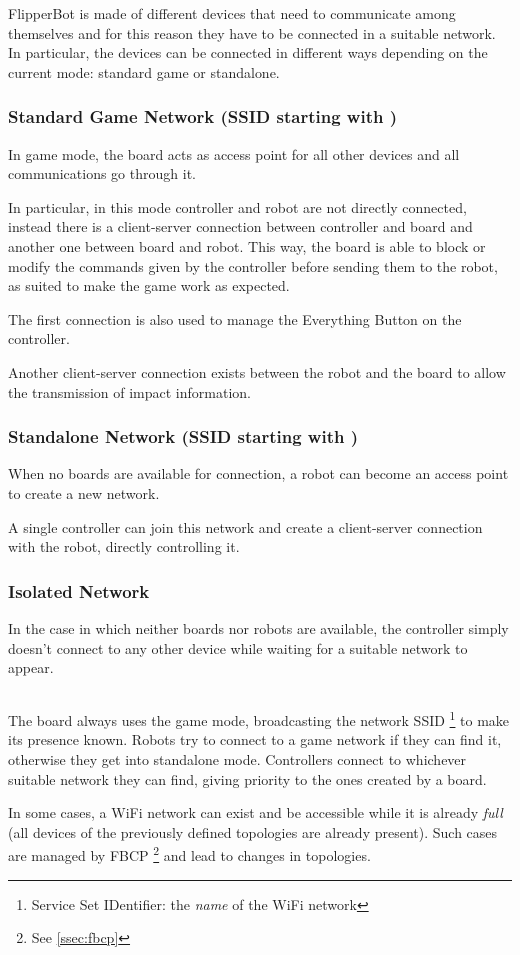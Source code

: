 FlipperBot is made of different devices that need to communicate
among themselves and for this reason they have to be connected in a
suitable network. In particular, the devices can be connected in
different ways depending on the current mode: standard game or
standalone.

\subsubsection{Standard Game Network (SSID starting with
  )}
  In game mode, the board acts as access point for all other devices
  and all communications go through it.

  In particular, in this mode controller and robot are not directly
  connected, instead there is a client-server connection between
  controller and board and another one between board and robot. This
  way, the board is able to block or modify the commands given by
  the controller before sending them to the robot, as suited to make
  the game work as expected.

  The first connection is also used to manage the Everything Button
  on the controller.

  Another client-server connection exists between the robot and the
  board to allow the transmission of impact information.

\subsubsection{Standalone Network (SSID starting with
  )}
  When no boards are available for connection, a robot can become an
  access point to create a new network.

  A single controller can join this network and create a
  client-server connection with the robot, directly controlling it.

\subsubsection{Isolated Network}
  In the case in which neither boards nor robots are available, the
  controller simply doesn't connect to any other device while
  waiting for a suitable network to appear.

\subsection*{}
The board always uses the game mode, broadcasting the network SSID%
\footnote{Service Set IDentifier: the \textit{name} of the WiFi
network} to make its presence known. Robots try to connect to a game
network if they can find it, otherwise they get into standalone
mode. Controllers connect to whichever suitable network they can
find, giving priority to the ones created by a board.

In some cases, a WiFi network can exist and be accessible while it
is already \textit{full} (all devices of the previously defined
topologies are already present). Such cases are managed by FBCP%
\footnote{See \ref{ssec:fbcp}} and lead to changes in topologies.

